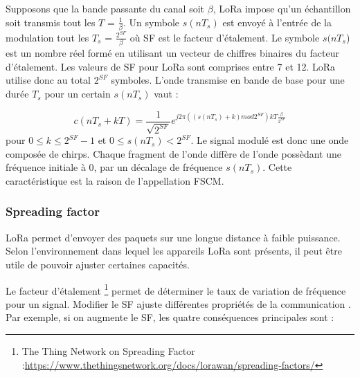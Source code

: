 Supposons que la bande passante du canal soit $\beta$, \ac{LoRa} impose qu'un échan\-tillon soit transmis tout les $T$ = $\frac{1}{\beta}$. Un symbole $s(nT_s)$ est envoyé à l'entrée de la modulation tout les $T_s$ = $\frac{2^{SF}}{\beta}$ où \ac{SF} est le facteur d'étalement. Le symbole $s(nT_s$) est un nombre réel formé en utilisant un vecteur de chiffres binaires du facteur d'étalement. Les valeurs de \ac{SF} pour LoRa sont comprises entre 7 et 12. \ac{LoRa} utilise donc au total $2^{SF}$ symboles. L'onde transmise en bande de base pour une durée $T_s$ pour un certain $s(nT_s)$ vaut :

\begin{equation}
c(nT_s + kT) = \frac{1}{\sqrt{2^{SF}}} e^{j2\pi ((s(nT_s) +k )mod 2^{SF})kT \frac{\beta}{2^{SF}}}
\end{equation}
pour $0 \leq k \leq 2^{SF}-1$ et $0 \leq s(nT_s) < 2^{SF}$.
Le signal modulé est donc une onde composée de chirps. Chaque fragment de l'onde diffère de l'onde possèdant une fréquence initiale à 0, par un décalage de fréquence $s(nT_s)$. Cette caractéristique est la raison de l'appellation \ac{FSCM}.


\subsubsection{Spreading factor}

LoRa permet d'envoyer des paquets sur une longue distance à faible puissance. Selon l'environnement dans lequel les appareils LoRa sont présents, il peut être utile de pouvoir ajuster certaines capacités.

\vspace{0.1cm}

Le facteur d'étalement \footnote{The Thing Network on Spreading Factor :\href{https://www.thethingsnetwork.org/docs/lorawan/spreading-factors/}{https://www.thethingsnetwork.org/docs/lorawan/spreading-factors/}} permet de déterminer le taux de variation de fréquence pour un signal. Modifier le \ac{SF} ajuste différentes propriétés de la communication . Par exemple, si on augmente le \ac{SF}, les quatre conséquences principales sont :

\vspace{0.1cm}

